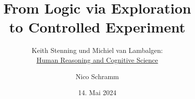 
\title[From Logic via Exploration to Controlled Experiment]
    {From Logic via Exploration\\to Controlled Experiment}

\subtitle[Keith Stenning und Michiel von Lambalgen: Human Reasoning and Cognitive Science]
    {Keith Stenning und Michiel van Lambalgen:\\
        \href{https://doi.org/10.7551/mitpress/7964.001.0001}{Human Reasoning and Cognitive Science}}

\date{14. Mai 2024}
\author[N. Schramm]{Nico Schramm}

